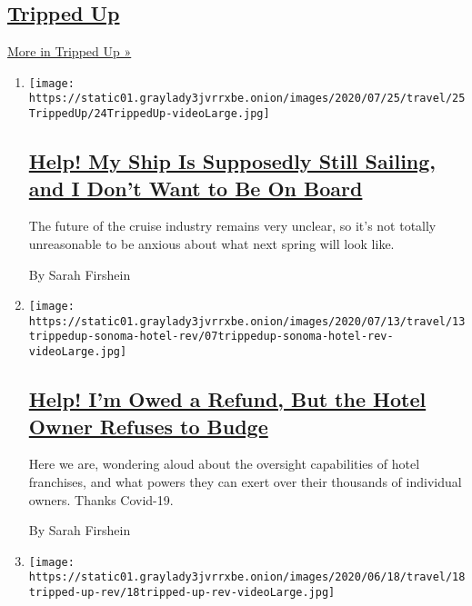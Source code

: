 \hypertarget{tripped-up}{%
\subsection{\texorpdfstring{\href{/column/tripped-up}{Tripped
Up}}{Tripped Up}}\label{tripped-up}}

\href{/column/tripped-up}{More in Tripped Up »}

\begin{enumerate}
\def\labelenumi{\arabic{enumi}.}
\item
  \texttt{[image: https://static01.graylady3jvrrxbe.onion/images/2020/07/25/travel/25TrippedUp/24TrippedUp-videoLarge.jpg]}

  \hypertarget{help-my-ship-is-supposedly-still-sailing-and-i-dont-want-to-be-on-board}{%
  \subsection{\texorpdfstring{\href{/2020/07/22/travel/virus-cruise-refunds.html}{Help!
  My Ship Is Supposedly Still Sailing, and I Don't Want to Be On
  Board}}{Help! My Ship Is Supposedly Still Sailing, and I Don't Want to Be On Board}}\label{help-my-ship-is-supposedly-still-sailing-and-i-dont-want-to-be-on-board}}

  The future of the cruise industry remains very unclear, so it's not
  totally unreasonable to be anxious about what next spring will look
  like.

  By Sarah Firshein
\item
  \texttt{[image: https://static01.graylady3jvrrxbe.onion/images/2020/07/13/travel/13trippedup-sonoma-hotel-rev/07trippedup-sonoma-hotel-rev-videoLarge.jpg]}

  \hypertarget{help-im-owed-a-refund-but-the-hotel-owner-refuses-to-budge}{%
  \subsection{\texorpdfstring{\href{/2020/07/07/travel/virus-refunds-hotel-franchises.html}{Help!
  I'm Owed a Refund, But the Hotel Owner Refuses to
  Budge}}{Help! I'm Owed a Refund, But the Hotel Owner Refuses to Budge}}\label{help-im-owed-a-refund-but-the-hotel-owner-refuses-to-budge}}

  Here we are, wondering aloud about the oversight capabilities of hotel
  franchises, and what powers they can exert over their thousands of
  individual owners. Thanks Covid-19.

  By Sarah Firshein
\item
  \texttt{[image: https://static01.graylady3jvrrxbe.onion/images/2020/06/18/travel/18tripped-up-rev/18tripped-up-rev-videoLarge.jpg]}


\end{enumerate}
